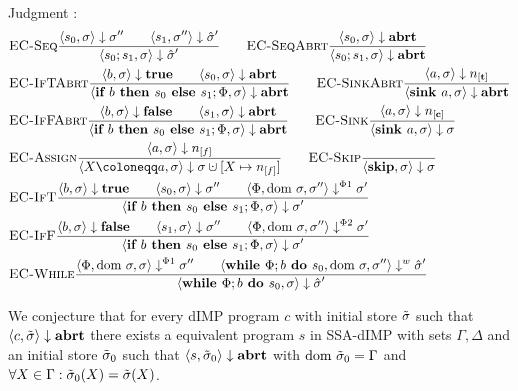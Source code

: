 \\
Judgment :
\begin{align*}
    &\bsrule{EC-Seq}{\bigstep{s_0}{\sigma}{\store''} \qquad \bigstep{s_1}{\store''}{\excstore'}}
    {\bigstep{\defaultssaseq}{\store}{\excstore'}}\qquad
    \bsrule{EC-SeqAbrt}{\bigstep{s_0}{\sigma}{\exception}}
    {\bigstep{\defaultssaseq}{\store}{\exception}} \\
    &\bsrule{EC-IfTAbrt}{\bigstep{b}{\store}{\btrue}\qquad \bigstep{s_0}{\store}{\exception}}
    {\bigstep{\defaultssaif}{\store}{\exception}} \qquad
    \bsrule{EC-SinkAbrt}{\bigstep{a}{\store}{\tracked{}}}
    {\bigstep{\defaultsink}{\store}{\exception}}\\
    &\bsrule{EC-IfFAbrt}{\bigstep{b}{\store}{\bfalse}\qquad \bigstep{s_1}{\store}{\exception}}
    {\bigstep{\defaultssaif}{\store}{\exception}} \qquad
    \bsrule{EC-Sink}{\bigstep{a}{\store}{\clean{}}}
    {\bigstep{\defaultsink}{\store}{\store}}\\
    &\bsrule{EC-Assign}{\bigstep{a}{\store}{\flagged{}}}
    {\bigstep{\defaultstore}{\store}{\storeassign{\store}{X \mapsto \flagged{}}}} \qquad
    \bsrule{EC-Skip}{}{\bigstep{\skipcmd}{\store}{\store}}\\
    &\bsrule{EC-IfT}{\bigstep{b}{\store}{\btrue}\qquad \bigstep{s_0}{\store}{\store''}
    \qquad \bigsteppl{\philist}{\dom\store}{\store''}{\store'}}
    {\bigstep{\defaultssaif}{\store}{\store'}}\\
    &\bsrule{EC-IfF}{\bigstep{b}{\store}{\bfalse}\qquad \bigstep{s_1}{\store}{\store''}
    \qquad \bigsteppr{\philist}{\dom\store}{\store''}{\store'}}
    {\bigstep{\defaultssaif}{\store}{\store'}}\\
    &\bsrule{EC-While}{\bigsteppl{\philist}{\dom\store}{\store}{\store''} \qquad
    \bigstepw{\defaultssawhile}{\dom\store}{\store''}{\excstore'}}
    {\bigstep{\defaultssawhile}{\store}{\excstore'}}\\
\end{align*}

\begin{conjecture}
    We conjecture that for every dIMP program $c$ with initial store $\tilde{\sigma}$
    such that $\langle c, \tilde{\sigma} \rangle \downarrow \textbf{abrt}$ there exists a equivalent program
    $s$ in SSA-dIMP with sets $\Gamma, \Delta$ and an initial store $\tilde{\sigma}_0$ such that
     $\langle s, \tilde{\sigma}_0 \rangle \downarrow \textbf{abrt}$ with
    $\text{dom }{\tilde{\sigma}_0} = \Gamma$ and $\forall X \in \Gamma: \tilde{\sigma}_0(X) = \tilde{\sigma}(X)$.
\end{conjecture}


